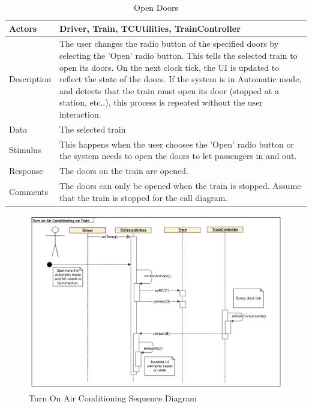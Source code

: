 \documentclass[]{article}
\begin{document}
\begin{table}[H]
	\centering
	\caption{Open Doors}
	\begin{tabular}{|l|l|}
		\hline
		Actors & \parbox[t]{10cm}{Driver, Train, TCUtilities, TrainController} \\ \hline
		Description & \parbox[t]{10cm}{The user changes the radio button of the specified doors by selecting the 'Open' radio button. This tells the selected train to open its doors. On the next clock tick, the UI is updated to reflect the state of the doors. If the system is in Automatic mode, and detects that the train must open its door (stopped at a station, etc..), this process is repeated without the user interaction.} \\ \hline
		Data &  \parbox[t]{10cm}{The selected train} \\ \hline
		Stimulus &  \parbox[t]{10cm}{ This happens when the user chooses the 'Open' radio button or the system needs to open the doors to let passengers in and out. } \\ \hline
		Response & \parbox[t]{10cm}{The doors on the train are opened. }\\ \hline
		Comments & \parbox[t]{10cm}{The doors can only be opened when the train is stopped. Assume that the train is stopped for the call diagram. }  \\ \hline
	\end{tabular}
\end{table}

\begin{figure}[H]
	\centering
	\includegraphics[width=\textwidth]{tc_turnOnAC_usecase}
	\caption{Turn On Air Conditioning Sequence Diagram}
\end{figure}
\end{document}
